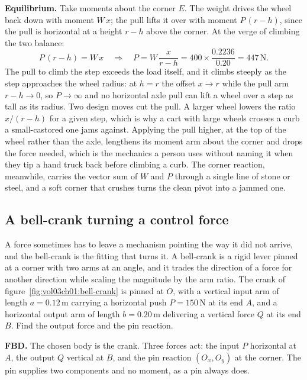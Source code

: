 \textbf{Equilibrium.} Take moments about the corner $E$. The weight drives the
wheel back down with moment $W\,x$; the pull lifts it over with moment $P\,(r -
h)$, since the pull is horizontal at a height $r - h$ above the corner. At the
verge of climbing the two balance:
\[
P\,(r - h) = W\,x
\quad\Longrightarrow\quad
P = W\,\frac{x}{r - h}
= 400 \times \frac{0.2236}{0.20} = 447\,\text{N}.
\]
The pull to climb the step exceeds the load itself, and it climbs steeply as
the step approaches the wheel radius: at $h = r$ the offset $x \to r$ while the
pull arm $r - h \to 0$, so $P \to \infty$ and no horizontal axle pull can lift
a wheel over a step as tall as its radius. Two design moves cut the pull. A
larger wheel lowers the ratio $x/(r-h)$ for a given step, which is why a cart
with large wheels crosses a curb a small-castored one jams against. Applying
the pull higher, at the top of the wheel rather than the axle, lengthens its
moment arm about the corner and drops the force needed, which is the mechanics
a person uses without naming it when they tip a hand truck back before
climbing a curb. The corner reaction, meanwhile, carries the vector sum of $W$
and $P$ through a single line of stone or steel, and a soft corner that
crushes turns the clean pivot into a jammed one.

\subsection{A bell-crank turning a control force}



A force sometimes has to leave a mechanism pointing the way it did not arrive,
and the bell-crank is the fitting that turns it. A bell-crank is a rigid lever
pinned at a corner with two arms at an angle, and it trades the direction of a
force for another direction while scaling the magnitude by the arm ratio. The
crank of figure~\ref{fig:vol03ch01:bell-crank} is pinned at $O$, with a
vertical input arm of length $a = 0.12\,\si{\meter}$ carrying a horizontal push
$P = 150\,\text{N}$ at its end $A$, and a horizontal output arm of length $b =
0.20\,\si{\meter}$ delivering a vertical force $Q$ at its end $B$. Find the
output force and the pin reaction.

\textbf{FBD.} The chosen body is the crank. Three forces act: the input $P$
horizontal at $A$, the output $Q$ vertical at $B$, and the pin reaction $(O_x,
O_y)$ at the corner. The pin supplies two components and no moment, as a pin
always does.

